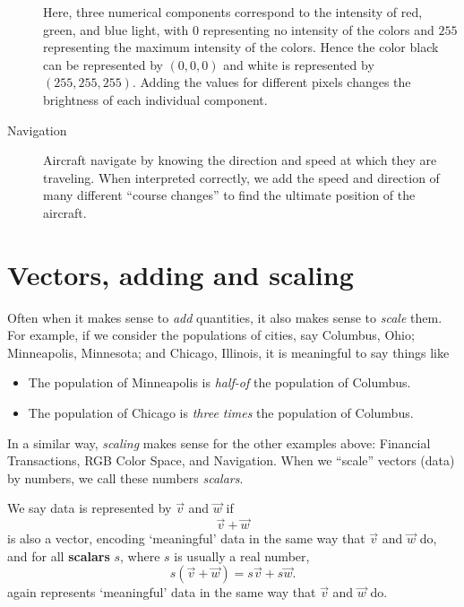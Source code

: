 \documentclass{ximera}
\begin{document}
\begin{concept}
\begin{description}
\begin{center}
  \end{center}
  Here, three numerical components correspond to the intensity of red,
  green, and blue light, with $0$ representing no intensity of the
  colors and $255$ representing the maximum intensity of the
  colors. Hence the color black can be represented by $(0,0,0)$ and
  white is represented by $(255,255,255)$.  Adding the values for
  different pixels changes the brightness of each individual
  component.
\item[Navigation] Aircraft navigate by knowing the direction and speed
  at which they are traveling. When interpreted correctly, we add the
  speed and direction of many different ``course changes'' to find the
  ultimate position of the aircraft.
\end{description}
\end{concept}



\section{Vectors, adding and scaling}


Often when it makes sense to \textit{add} quantities, it also makes
sense to \textit{scale} them. For example, if we consider the
populations of cities, say Columbus, Ohio; Minneapolis, Minnesota; and
Chicago, Illinois, it is meaningful to say things like
\begin{itemize}
\item The population of Minneapolis is \textit{half-of} the population of Columbus.
\item The population of Chicago is \textit{three times} the population of Columbus.
\end{itemize}
In a similar way, \textit{scaling} makes sense for the other examples
above: Financial Transactions, RGB Color Space, and Navigation. When
we ``scale'' vectors (data) by numbers, we call these numbers
\textit{scalars}.

\begin{definition}
  We say data is represented by  $\vec{v}$ and $\vec{w}$
  if
  \[
  \vec{v}+\vec{w}
  \]
  is also a vector, encoding `meaningful' data in the same way that
  $\vec{v}$ and $\vec{w}$ do, and for all \textbf{scalars} $s$, where
  $s$ is usually a real number,
  \[
  s(\vec{v} + \vec{w}) = s\vec{v}+ s\vec{w}.
  \]
  again represents `meaningful' data in the same way that $\vec{v}$
  and $\vec{w}$ do.
\end{definition}
\end{document}
